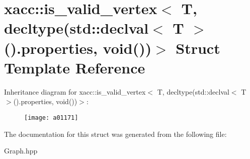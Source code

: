 \hypertarget{a01171}{}\section{xacc\+:\+:is\+\_\+valid\+\_\+vertex$<$ T, decltype(std\+:\+:declval$<$ T $>$().properties, void())$>$ Struct Template Reference}
\label{a01171}
Inheritance diagram for xacc\+:\+:is\+\_\+valid\+\_\+vertex$<$ T, decltype(std\+:\+:declval$<$ T $>$().properties, void())$>$\+:\begin{figure}[H]
\begin{center}
\leavevmode
\texttt{[image: a01171]}
\end{center}
\end{figure}


The documentation for this struct was generated from the following file\+:\begin{DoxyCompactItemize}
\item 
Graph.\+hpp\end{DoxyCompactItemize}
